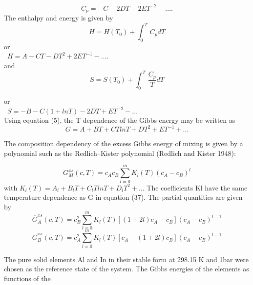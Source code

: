 \documentclass[12pt]{article}
\newcommand*{\1}{\hspace{1pt}}
\begin{document}
    \begin{equation}
        C _p = -C - 2DT -2ET^{-2} - ....
    \end{equation}
The enthalpy and energy is given by\\

    \begin{equation}
        H = H(T _0) + \int_{0}^{T}  \,C _pdT
    \end{equation}
or\\
     \  $ H = A - CT -DT^{2} + 2ET^{-1} - .... $ \\
and
    \begin{equation}
        S = S(T_0) + \int_{0}^{T}  \,\frac{C _p}{T} dT 
    \end{equation}

or\\
\   $ S = -B -C(1 + lnT) - 2DT +ET^{-2} - ... $\\

Using equation (5), the T dependence of the Gibbs energy may be written as\\

    \begin{equation}
        G = A + BT + CT ln T +DT^2 + ET^{-1} + ... 
    \end{equation}

The composition dependency of the excess Gibbs energy of mixing 
is given by a polynomial such as the Redlich–Kister polynomial 
(Redlich and Kister 1948):

    \begin{equation}
        G^{xs}_M{(c, T)} = c _Ac _B\sum_{l = 0}^{m} K _l{(T)}(c_A - c _B)^l   
    \end{equation}
with $ K_l (T ) = A _l + B_l T + C_l T ln T + D_l T^{2} + ...$ The coefficients Kl have the same
temperature dependence as G in equation (37). The partial
 quantities are given by \\

    \begin{equation}
        \overline{G}^{xs}_A{(c, T)} = c _B^{2}\sum_{l = 0}^{m} K _l{(T)}[(1 + 2l)c_A - c _B](c_A - c _B)^{l-1}  
    \end{equation}
    \begin{equation}
        \overline{G}^{xs}_B{(c, T)} = c _A^{2}\sum_{l = 0}
        ^{m} K _l{(T)}[c_A - (1 + 2l)c _B](c_A - c _B)^{l-1}  
    \end{equation}

The pure solid elements Al and In in their stable form at 298.15 K 
and 1bar were chosen as the reference state of the system. 
The Gibbs energies of the elements as functions of the \\
\end{document}
